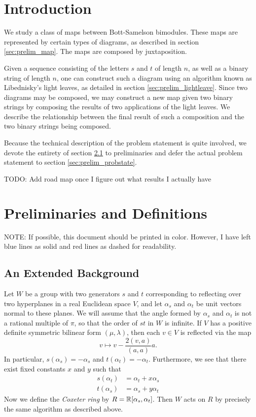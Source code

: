 
\section{Introduction}
We study a class of maps between Bott-Samelson bimodules.  These maps are represented by certain types of diagrams, as described in section \ref{sec:prelim_map}.  The maps are composed by juxtaposition.

Given a sequence consisting of the letters $s$ and $t$ of length $n$, as well as a binary string of length $n$, one can construct such a diagram using an algorithm known as Libednisky's light leaves, as detailed in section \ref{sec:prelim_lightleave}.  Since two diagrams may be composed, we may construct a new map given two binary strings by composing the results of two applications of the light leaves.  We describe the relationship between the final result of such a composition and the two binary strings being composed.

Because the technical description of the problem statement is quite involved, we devote the entirety of section \ref{sec:prelim} to preliminaries and defer the actual problem statement to section \ref{sec:prelim_probstate}.  

TODO: Add road map once I figure out what results I actually have

\section{Preliminaries and Definitions}
NOTE: If possible, this document should be printed in color.  However, I have left blue lines as solid and red lines as dashed for readability.

\subsection{An Extended Background}
\label{sec:prelim}
Let $W$ be a group with two generators $s$ and $t$ corresponding to reflecting over two hyperplanes in a real Euclidean space $V$, and let $\alpha_s$ and $\alpha_t$ be unit vectors normal to these planes.  We will assume that the angle formed by $\alpha_s$ and $\alpha_t$ is not a rational multiple of $\pi$, so that the order of $st$ in $W$ is infinite.  If $V$ has a positive definite symmetric bilinear form $(\mu, \lambda)$, then each $v \in V$ is reflected via the map \[ v \mapsto v - \frac{2(v,a)}{(a,a)} a. \]  In particular, $s(\alpha_s) = -\alpha_s$ and $t(\alpha_t) = -\alpha_t$.  Furthermore, we see that there exist fixed constants $x$ and $y$ such that
\begin{align*}
	s(\alpha_t) &= \alpha_t + x \alpha_s \\
	t(\alpha_s) &= \alpha_s + y \alpha_t
\end{align*}
Now we define the \emph{Coxeter ring} by $R = \mathbb R[\alpha_s, \alpha_t]$.  Then $W$ acts on $R$ by precisely the same algorithm as described above.

